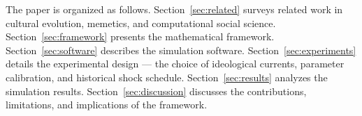 The paper is organized as follows. Section~\ref{sec:related} surveys related
work in cultural evolution, memetics, and computational social science.
Section~\ref{sec:framework} presents the mathematical framework.
Section~\ref{sec:software} describes the simulation software.
Section~\ref{sec:experiments} details the experimental design --- the choice
of ideological currents, parameter calibration, and historical shock
schedule. Section~\ref{sec:results} analyzes the simulation results.
Section~\ref{sec:discussion} discusses the contributions, limitations, and
implications of the framework.
